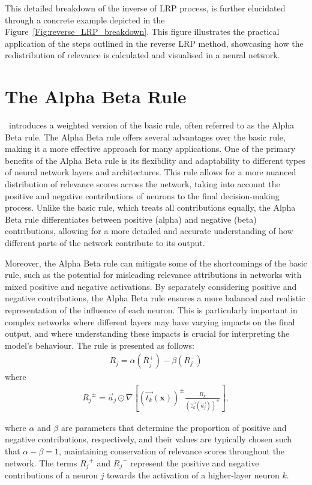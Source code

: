 This detailed breakdown of the inverse of LRP process, is further elucidated through a concrete example depicted in the Figure~\ref{Fig:reverse_LRP_breakdown}. This figure illustrates the practical application of the steps outlined in the reverse LRP method, showcasing how the redistribution of relevance is calculated and visualised in a neural network.
\newpage
\section{The Alpha Beta Rule}
\label{section:more}

\LRP\ introduces a weighted version of the basic rule, often referred to as the Alpha Beta rule. The Alpha Beta rule offers several advantages over the basic rule, making it a more effective approach for many applications. One of the primary benefits of the Alpha Beta rule is its flexibility and adaptability to different types of neural network layers and architectures. This rule allows for a more nuanced distribution of relevance scores across the network, taking into account the positive and negative contributions of neurons to the final decision-making process. Unlike the basic rule, which treats all contributions equally, the Alpha Beta rule differentiates between positive (alpha) and negative (beta) contributions, allowing for a more detailed and accurate understanding of how different parts of the network contribute to its output.

Moreover, the Alpha Beta rule can mitigate some of the shortcomings of the basic rule, such as the potential for misleading relevance attributions in networks with mixed positive and negative activations. By separately considering positive and negative contributions, the Alpha Beta rule ensures a more balanced and realistic representation of the influence of each neuron. This is particularly important in complex networks where different layers may have varying impacts on the final output, and where understanding these impacts is crucial for interpreting the model's behaviour. The rule is presented as follows:
\begin{eqnarray*}
R_{j}= \alpha (R_{j}^+) - \beta(R_{j}^-)
\end{eqnarray*}
where
\begin{eqnarray*}
{R_{j}}^\pm = \vec{a}_{j} \odot \nabla\left [(\vec{t_{k}}(\boldsymbol{x}))^\pm\frac{R_{k}}{(\vec{z_k}(\vec{a_j}))^\pm}\right], 
\end{eqnarray*}

where \(\alpha\) and \(\beta\) are parameters that determine the proportion of positive and negative contributions, respectively, and their values are typically chosen such that \(\alpha - \beta = 1\), maintaining conservation of relevance scores throughout the network. The terms \({R_{j}}^+\) and \({R_{j}}^-\) represent the positive and negative contributions of a neuron \(j\) towards the activation of a higher-layer neuron \(k\). 

